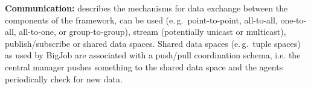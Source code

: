 \documentclass[conference,final]{IEEEtran}
\newcommand{\alnote}[1]{ {\textcolor{blue} { ***andre: #1 }}}
\newcommand{\alnote}[1]{}
\begin{document}
\textbf{Communication:} describes the mechanisms for data exchange between the
components of the framework, can be used (e.\,g.\ point-to-point, all-to-all,
one-to-all, all-to-one, or group-to-group), stream (potentially unicast or
multicast), publish/subscribe or shared data spaces. Shared data spaces (e.\,g.\
tuple spaces) as used by BigJob are associated with a push/pull coordination
schema, i.e. the central manager pushes something to the shared data space and
the agents periodically check for new data.
		
\end{document}
